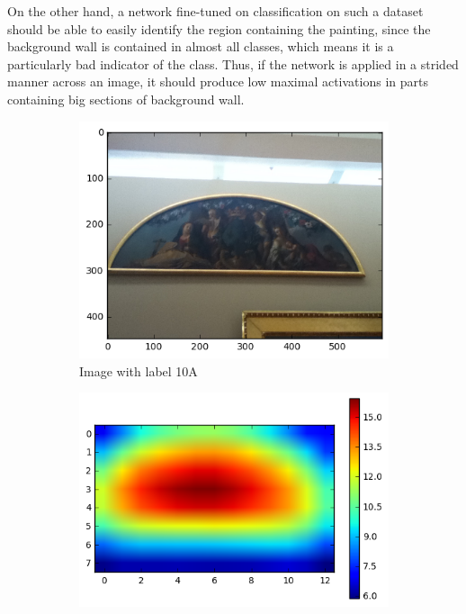 On the other hand, a network fine-tuned on classification on such a dataset
should be able to easily identify the region containing the painting, since
the background wall is contained in almost all classes, which means it is a
particularly bad indicator of the class. Thus, if the network is applied in
a strided manner across an image, it should produce low maximal activations
in parts containing big sections of background wall.

\begin{figure}
\centering
\begin{subfigure}[b]{0.3\textwidth}
\includegraphics[width=\textwidth]{img/sample1_10A-0519.png}
\caption{Image with label 10A\label{fig:sample1_id}}
\end{subfigure}
\begin{subfigure}[b]{0.3\textwidth}
\includegraphics[width=\textwidth]{img/sample1_heatmap.png}

\end{subfigure}
\end{figure}
